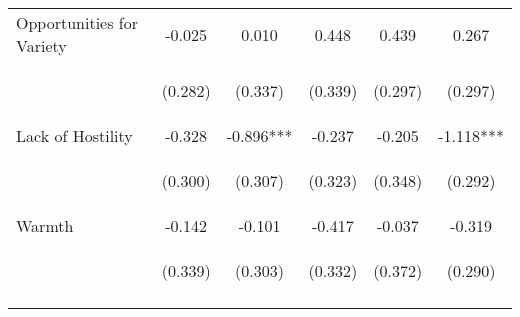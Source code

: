 \begin{tabular}{lccccc}
\noalign{\smallskip}Opportunities for Variety & -0.025 & 0.010 & 0.448 & 0.439 & 0.267\\
 & \begin{footnotesize}(0.282)\end{footnotesize} & \begin{footnotesize}(0.337)\end{footnotesize} & \begin{footnotesize}(0.339)\end{footnotesize} & \begin{footnotesize}(0.297)\end{footnotesize} & \begin{footnotesize}(0.297)\end{footnotesize}\\
\noalign{\smallskip}Lack of Hostility & -0.328 & -0.896*** & -0.237 & -0.205 & -1.118***\\
 & \begin{footnotesize}(0.300)\end{footnotesize} & \begin{footnotesize}(0.307)\end{footnotesize} & \begin{footnotesize}(0.323)\end{footnotesize} & \begin{footnotesize}(0.348)\end{footnotesize} & \begin{footnotesize}(0.292)\end{footnotesize}\\
\noalign{\smallskip}Warmth & -0.142 & -0.101 & -0.417 & -0.037 & -0.319\\
 & \begin{footnotesize}(0.339)\end{footnotesize} & \begin{footnotesize}(0.303)\end{footnotesize} & \begin{footnotesize}(0.332)\end{footnotesize} & \begin{footnotesize}(0.372)\end{footnotesize} & \begin{footnotesize}(0.290)\end{footnotesize}\\
\noalign{\smallskip}\hline\end{tabular}\\
